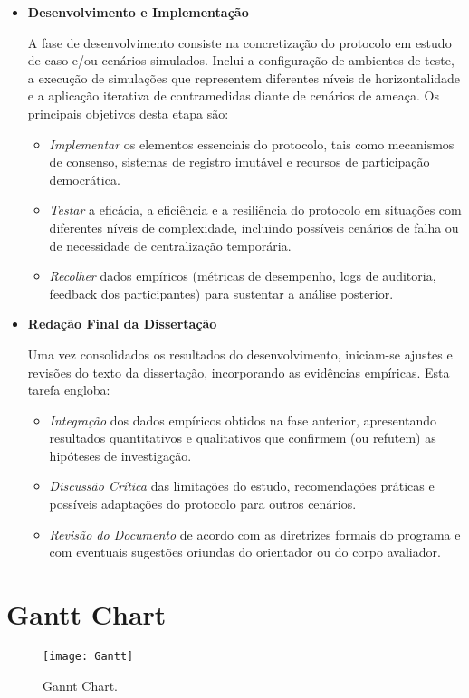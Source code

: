 \begin{itemize}
  
  \item \textbf{Desenvolvimento e Implementação}
  
  A fase de desenvolvimento consiste na concretização do protocolo em estudo
  de caso e/ou cenários simulados. Inclui a configuração de ambientes de
  teste, a execução de simulações que representem diferentes níveis de
  horizontalidade e a aplicação iterativa de contramedidas diante de
  cenários de ameaça. Os principais objetivos desta etapa são:
  \begin{itemize}
    \item \emph{Implementar} os elementos essenciais do protocolo, tais como
    mecanismos de consenso, sistemas de registro imutável e recursos de
    participação democrática.
    \item \emph{Testar} a eficácia, a eficiência e a resiliência do protocolo em
    situações com diferentes níveis de complexidade, incluindo possíveis
    cenários de falha ou de necessidade de centralização temporária.
    \item \emph{Recolher} dados empíricos (métricas de desempenho, logs de
    auditoria, feedback dos participantes) para sustentar a análise
    posterior.
  \end{itemize}
  \vspace{1em}
  
  \item \textbf{Redação Final da Dissertação}
  
  Uma vez consolidados os resultados do desenvolvimento, iniciam-se
  ajustes e revisões do texto da dissertação, incorporando as
  evidências empíricas. Esta tarefa engloba:
  \begin{itemize}
    \item \emph{Integração} dos dados empíricos obtidos na fase anterior,
    apresentando resultados quantitativos e qualitativos que confirmem (ou
    refutem) as hipóteses de investigação.
    \item \emph{Discussão Crítica} das limitações do estudo, recomendações
    práticas e possíveis adaptações do protocolo para outros cenários.
    \item \emph{Revisão do Documento} de acordo com as diretrizes formais do
    programa e com eventuais sugestões oriundas do orientador ou do corpo
    avaliador.
  \end{itemize}
  \vspace{1em}
  
\end{itemize}




\section{Gantt Chart}
\label{sec:gantt_chart}


\begin{figure}[htbp]
  \centering
  \texttt{[image: Gantt]}
  \caption{Gannt Chart.}
  \label{fig:Gannt}
\end{figure}